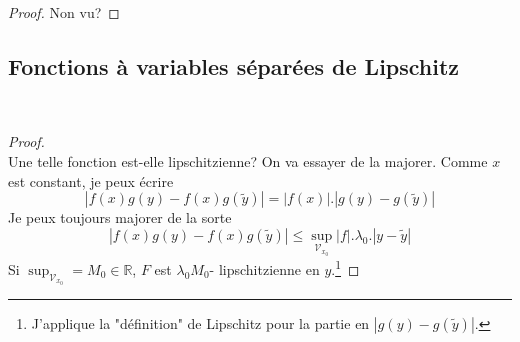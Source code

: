 	
	
\begin{proof}
	Non vu? 
\end{proof}
	
\setcounter{subsection}{2}
\subsection{Fonctions à variables séparées de Lipschitz}
\ 	
\begin{proof}\ \\
	Une telle fonction est-elle lipschitzienne? On va essayer de la majorer. Comme 
	$x$ est constant, je peux écrire 
	\begin{equation}
		|f(x)g(y) - f(x)g(\tilde{y})| = |f(x)|.|g(y)-g(\tilde{y})|
	\end{equation}
	Je peux toujours majorer de la sorte
	\begin{equation}
		|f(x)g(y) - f(x)g(\tilde{y})| \leq \sup_{\mathcal{V}_{x_0}} |f|.\lambda_0.
		|y-\tilde{y}|
	\end{equation}
	Si $\sup_{\mathcal{V}_{x_0}} = M_0\in\mathbb{R}$, $F$ est $\lambda_0 M_0$-
	lipschitzienne en $y$.\footnote{J'applique la "définition" de Lipschitz pour 
		la partie en $|g(y)-g(\tilde{y})|$.}
\end{proof}
	
	
	
\setcounter{subsection}{5}

